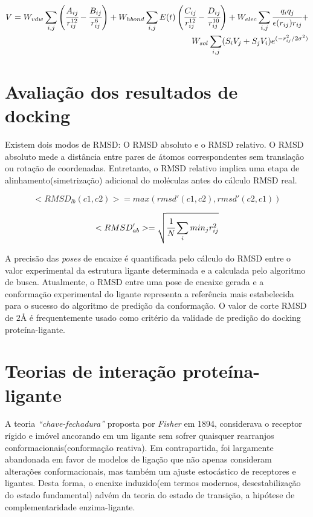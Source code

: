 \begin{equation}
\begin{split}
       V = W_{vdw} \sum_{i,j} \left( \cfrac{A_{ij}}{r_{ij}^{12}} - \cfrac{B_{ij}}{r_{ij}^6} \right) + W_{hbond} \sum_{i,j} E(t) \left(  \cfrac{C_{ij}}{r_{ij}^{12}} - \cfrac{D_{ij}}{r_{ij}^{10}}    \right) + W_{elec} \sum_{i,j} \cfrac{q_i q_j}{\epsilon(r_{ij}) r_{ij}} + \\ W_{sol} \sum_{i, j} (S_i V_j + S_j V_i) e^{(-r_{ij}^2/2\sigma^2)}
\end{split}
\end{equation}

\section{Avaliação dos resultados de docking}

Existem dois modos de RMSD: O RMSD absoluto e o RMSD relativo. O RMSD absoluto mede a distância entre pares de átomos correspondentes sem translação ou rotação de coordenadas. Entretanto, o RMSD relativo implica uma etapa de alinhamento(simetrização) adicional do moléculas antes do cálculo RMSD real. \cite{Kirchmair2008}

\begin{equation}
    <RMSD_{lb}(c1, c2)> = max(rmsd'(c1, c2), rmsd'(c2, c1))
\end{equation}

\begin{equation}
    <RMSD'_{ab}> = \sqrt{\cfrac{1}{N} \sum_{i} min_{j} r_{ij}^2}
\end{equation}

A precisão das \textit{poses} de encaixe é quantificada pelo cálculo do RMSD entre o valor experimental da estrutura ligante determinada e a calculada pelo algoritmo de busca. Atualmente, o RMSD entre uma pose de encaixe gerada e a conformação experimental do ligante representa a referência mais estabelecida para o sucesso do algoritmo de predição da conformação. \cite{Kirchmair2008} O valor de corte RMSD de $2 \si{\angstrom}$  é frequentemente usado como critério da validade de predição do docking proteína-ligante. \cite{Bursulaya2003} 

\section{Teorias de interação proteína-ligante}

A teoria \textit{``chave-fechadura''} proposta por \textit{Fisher} em 1894, considerava o receptor rígido e imóvel ancorando em um ligante sem sofrer quaisquer rearranjos conformacionais(conformação reativa). Em contrapartida, foi largamente abandonada em favor de modelos de ligação que não apenas consideram alterações conformacionais, mas também um ajuste estocástico de receptores e ligantes. \cite{Durrant2011} Desta forma, o encaixe induzido(em termos modernos, desestabilização do estado fundamental) advém da teoria do estado de transição, a hipótese de complementaridade enzima-ligante. \cite{Benkovic2003}

